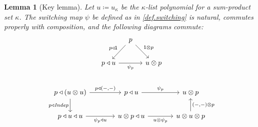 \documentclass[11pt, one side, article]{memoir}
\theoremstyle{definition}
\theoremstyle{plain}
\newtheorem{lemma}[definitionx]{Lemma}
\newcommand{\Fun}[1]{\mathit{#1}}%
\newcommand{\id}{\mathrm{id}}
\newcommand{\yon}{\mathcal{y}}
\newcommand{\0}{\textsf{0}}
\newcommand{\1}{\tn{\textsf{1}}}
\newcommand{\tri}{\mathbin{\triangleleft}}
\newcommand{\indep}{\Fun{Indep}}
\newcommand{\qqand}{\qquad\text{and}\qquad}
\begin{document}
\begin{lemma}[Key lemma]\label{lemma.key}
Let $u\coloneqq u_\kappa$ be the $\kappa$-list polynomial for a sum-product set $\kappa$. The switching map $\psi$ be defined as in \cref{def.switching} is natural, commutes properly with composition,
and the following diagrams commute:
\begin{gather*}
\begin{tikzcd}[column sep=10pt, ampersand replacement=\&]
	\&p\ar[dl, "p\tri\1"']\ar[dr,"\1\otimes p"]\\
	p\tri u\ar[rr, "\psi_{p}"']\&\&u\otimes p
\end{tikzcd}
\\[15pt]
\begin{tikzcd}[, ampersand replacement=\&, column sep=large]
	p\tri(u\otimes u)\ar[r, "p\tri{(-,-)}"]\ar[d, "p\tri \indep"']\&
	p\tri u\ar[r, "\psi_{p}"]\&
	u\otimes p\\
	p\tri u\tri u\ar[r, "\psi_p\tri u"']\&
	u\otimes p\tri u\ar[r, "u\otimes\psi_{p}"']\&
	u\otimes u\otimes p\ar[u, "{(-,-)}\otimes p"']
\end{tikzcd}
\end{gather*}
\end{lemma}
\end{document}
